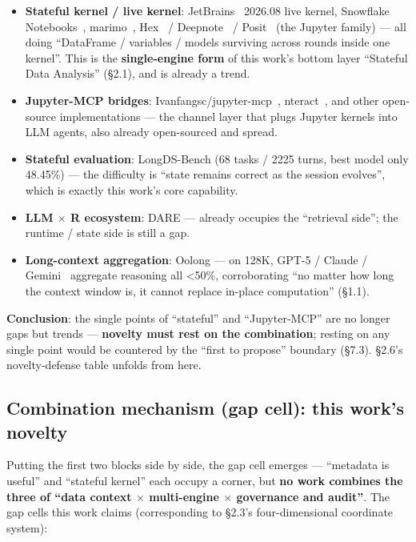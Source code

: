 \documentclass[11pt]{article}
\begin{document}
\begin{itemize}
\item
  \textbf{Stateful kernel / live kernel}: JetBrains~\cite{jetbrains-live-kernel} 2026.08 live kernel, Snowflake Notebooks~\cite{snowflake-notebooks}, marimo~\cite{marimo}, Hex~\cite{hex} / Deepnote~\cite{deepnote} / Posit~\cite{posit} (the Jupyter family) --- all doing ``DataFrame / variables / models surviving across rounds inside one kernel''. This is the \textbf{single-engine form} of this work's bottom layer ``Stateful Data Analysis'' (\S{}2.1), and is already a trend.
\item
  \textbf{Jupyter-MCP bridges}: Ivanfangsc/jupyter-mcp~\cite{jupyter-mcp}, nteract~\cite{nteract}, and other open-source implementations --- the channel layer that plugs Jupyter kernels into LLM agents, also already open-sourced and spread.
\item
  \textbf{Stateful evaluation}: LongDS-Bench \cite{longds-bench} (68 tasks / 2225 turns, best model only 48.45\%) --- the difficulty is ``state remains correct as the session evolves'', which is exactly this work's core capability.
\item
  \textbf{LLM $\times$ R ecosystem}: DARE \cite{dare} --- already occupies the ``retrieval side''; the runtime / state side is still a gap.
\item
  \textbf{Long-context aggregation}: Oolong \cite{oolong} --- on 128K, GPT-5 / Claude / Gemini~\cite{gemini} aggregate reasoning all \textless50\%, corroborating ``no matter how long the context window is, it cannot replace in-place computation'' (\S{}1.1).
\end{itemize}

\textbf{Conclusion}: the single points of ``stateful'' and ``Jupyter-MCP'' are no longer gaps but trends --- \textbf{novelty must rest on the combination}; resting on any single point would be countered by the ``first to propose'' boundary (\S{}7.3). \S{}2.6's novelty-defense table unfolds from here.

\subsection{Combination mechanism (gap cell): this work's novelty}

Putting the first two blocks side by side, the gap cell emerges --- ``metadata is useful'' and ``stateful kernel'' each occupy a corner, but \textbf{no work combines the three of ``data context $\times$ multi-engine $\times$ governance and audit''}. The gap cells this work claims (corresponding to \S{}2.3's four-dimensional coordinate system):
\end{document}
